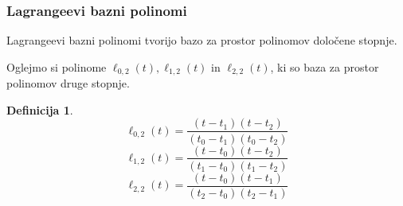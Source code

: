 \documentclass{beamer}
\newtheorem{definicija}{Definicija}
\begin{document}

\begin{frame}
\frametitle{Lagrangeevi bazni polinomi}

Lagrangeevi bazni polinomi tvorijo bazo za prostor polinomov določene stopnje.

\pause
Oglejmo si polinome $ \ell_{0,2}(t), \ell_{1,2}(t) $ in $ \ell_{2,2}(t) $, ki so baza za prostor polinomov druge stopnje.

\begin{definicija}

	$$ \ell_{0,2}(t) =  \frac{(t - t_1)(t - t_2)}{(t_0 - t_1)(t_0 - t_2)} $$
	$$ \ell_{1,2}(t) =  \frac{(t - t_0)(t - t_2)}{(t_1 - t_0)(t_1 - t_2)} $$
	$$ \ell_{2,2}(t) =  \frac{(t - t_0)(t - t_1)}{(t_2 - t_0)(t_2 - t_1)} $$

\end{definicija}

\end{frame}

\end{document}
